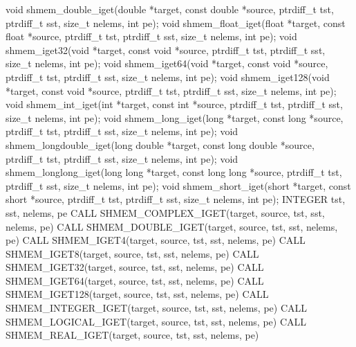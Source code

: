 \synC   %
void shmem_double_iget(double *target, const double *source, ptrdiff_t tst, ptrdiff_t sst, size_t nelems, int pe);
void shmem_float_iget(float *target, const float *source, ptrdiff_t tst, ptrdiff_t sst, size_t nelems, int pe);
void shmem_iget32(void *target, const void *source, ptrdiff_t tst, ptrdiff_t sst, size_t nelems, int pe);
void shmem_iget64(void *target, const void *source, ptrdiff_t tst, ptrdiff_t sst, size_t nelems, int pe);
void shmem_iget128(void *target, const void *source, ptrdiff_t  tst, ptrdiff_t sst, size_t nelems, int pe);
void shmem_int_iget(int *target, const int *source, ptrdiff_t tst, ptrdiff_t sst, size_t nelems, int pe);
void shmem_long_iget(long *target, const  long  *source,  ptrdiff_t tst, ptrdiff_t sst, size_t nelems, int pe);
void shmem_longdouble_iget(long double *target, const long double *source, ptrdiff_t tst, ptrdiff_t sst, size_t nelems, int pe);
void shmem_longlong_iget(long long *target, const long long *source, ptrdiff_t tst, ptrdiff_t sst, size_t nelems, int pe);
void shmem_short_iget(short *target, const short *source, ptrdiff_t tst, ptrdiff_t sst, size_t nelems, int pe);
\synF   %
INTEGER tst, sst, nelems, pe
CALL SHMEM_COMPLEX_IGET(target, source, tst, sst, nelems, pe)
CALL SHMEM_DOUBLE_IGET(target, source, tst, sst, nelems, pe)
CALL SHMEM_IGET4(target, source, tst, sst, nelems, pe)
CALL SHMEM_IGET8(target, source, tst, sst, nelems, pe)
CALL SHMEM_IGET32(target, source, tst, sst, nelems, pe)
CALL SHMEM_IGET64(target, source, tst, sst, nelems, pe)
CALL SHMEM_IGET128(target, source, tst, sst, nelems, pe)
CALL SHMEM_INTEGER_IGET(target, source, tst, sst, nelems, pe)
CALL SHMEM_LOGICAL_IGET(target, source, tst, sst, nelems, pe)
CALL SHMEM_REAL_IGET(target, source, tst, sst, nelems, pe)

